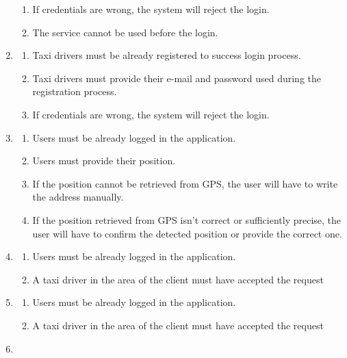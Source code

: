 \documentclass[a4paper]{article}
\begin{document}
\begin{enumerate}[label=\bfseries G\arabic*:]
\begin{enumerate}[label=\bfseries R\arabic*:]
        \item If credentials are wrong, the system will reject the login.
        \item The service cannot be used before the login.
        \end{enumerate}
    \item
        \begin{enumerate}[label=\bfseries R\arabic*:]
        \item Taxi drivers must be already registered to success login process.
        \item Taxi drivers must provide their e-mail and password used during the registration process.
        \item If credentials are wrong, the system will reject the login.
        \end{enumerate}
    \item
        \begin{enumerate}[label=\bfseries R\arabic*:]
        \item Users must be already logged in the application.
        \item Users must provide their position.
        \item If the position cannot be retrieved from GPS, the user will have to write the address manually.
        \item If the position retrieved from GPS isn't correct or sufficiently precise, the user will have to confirm the detected position or provide the correct one.
        \end{enumerate}
    \item
        \begin{enumerate}[label=\bfseries R\arabic*:]
        \item Users must be already logged in the application.
        \item A taxi driver in the area of the client must have accepted the request
        \end{enumerate}
    \item
        \begin{enumerate}[label=\bfseries R\arabic*:]
        \item Users must be already logged in the application.
        \item A taxi driver in the area of the client must have accepted the request
        \end{enumerate}
    \item
        \begin{enumerate}[label=\bfseries R\arabic*:]

\end{enumerate}
\end{enumerate}
\end{document}
